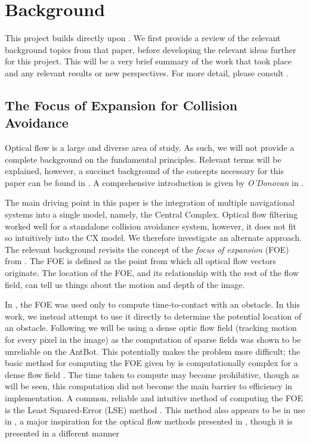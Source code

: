 \documentclass[a4paper,11pt,twoside,openright]{article}
\let\oldsection\section
\def\section{\cleardoublepage\oldsection}
\begin{document}
\section{ Background }
This project builds directly upon \cite{Mitchell2018}. We first provide a review
of the relevant background topics from that paper, before developing the relevant
ideas further for this project. This will be a very brief summary of the work
that took place and any relevant results or new perspectives. For more detail,
please consult \cite{Mitchell2018}.


\subsection{ The Focus of Expansion for Collision Avoidance } \label{OFBackground}
Optical flow is a large and diverse area of study. As such, we will
not provide a complete background on the fundamental
principles. Relevant terms will be explained, however, a succinct
background of the concepts necessary for this paper can be found in
\cite{Mitchell2018}. A comprehensive introduction is given by
\textit{O'Donovan} in \cite{ODonovan2005}.
\newline
\par

The main driving point in this paper is the integration of multiple
navigational systems into a single model, namely, the Central Complex.
Optical flow filtering worked well for a standalone collision
avoidance system, however, it does not fit so intuitively into the CX
model. We therefore investigate an alternate approach. The relevant
background revisits the concept of the \textit{focus of expansion}
(FOE) from \cite{Mitchell2018, ODonovan2005}.  The FOE is defined as
the point from which all optical flow vectors originate. The location
of the FOE, and its relationship with the rest of the flow field, can
tell us things about the motion and depth of the image.
\newline
\par

In \cite{Mitchell2018}, the FOE was used only to compute
time-to-contact with an obstacle. In this work, we instead attempt to
use it directly to determine the potential location of an
obstacle. Following \cite{Mitchell2018} we will be using a dense optic
flow field (tracking motion for every pixel in the image) as the
computation of sparse fields was shown to be unreliable on the
AntBot. This potentially makes the problem more difficult; the basic
method for computing the FOE given by \cite{ODonovan2005} is
computationally complex for a dense flow field
\cite{Mitchell2018}. The time taken to compute may become prohibitive,
though as will be seen, this computation did not become the main
barrier to efficiency in implementation. A common, reliable and
intuitive method of computing the FOE is the Least Squared-Error (LSE)
method \cite{Tistarelli1991, ODonovan2005, Vanderstap2012}. This
method also appears to be in use in \cite{Souhila2007}, a major
inspiration for the optical flow methods presented in
\cite{Mitchell2018}, though it is presented in a different manner
\end{document}
